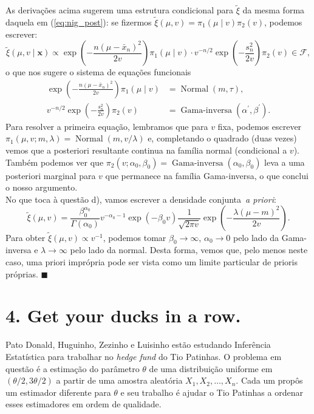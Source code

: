 \documentclass[a4paper,10pt, notitlepage]{report}
\newcommand{\rs}{X_1, X_2, \ldots, X_n} %
\begin{document}
{$$$$
As derivações acima sugerem uma estrutura condicional para $\tilde{\xi}$ da mesma forma daquela em (\ref{eq:nig_post}): se fizermos $\tilde{\xi}(\mu, v) = \pi_1(\mu \mid v) \pi_2(v)$, podemos escrever:
$$
\tilde{\xi}(\mu, v \mid \boldsymbol{x}) \propto \exp\left(-\frac{n(\mu-\bar{x}_n)^2}{2v}\right)\pi_1(\mu \mid v) \cdot v^{-n/2}\exp\left(-\frac{s_n^2}{2v}\right)\pi_2(v) \in \mathcal{F},
$$
o que nos sugere o sistema de equações funcionais
\begin{align*}
 \exp\left(-\frac{n(\mu-\bar{x}_n)^2}{2v}\right)\pi_1(\mu \mid v)  &= \operatorname{Normal}(m, \tau),\\
 v^{-n/2}\exp\left(-\frac{s_n^2}{2v}\right)\pi_2(v) &= \operatorname{Gama-inversa}(\alpha^\prime, \beta^\prime).
\end{align*}
Para resolver a primeira equação, lembramos que para $v$ fixa, podemos escrever $\pi_1(\mu, v; m, \lambda) = \operatorname{Normal}(m, v/\lambda)$ e, completando o quadrado (duas vezes) vemos que a posteriori resultante continua na família normal (condicional a $v$).
Também podemos ver que $\pi_2(v; \alpha_0, \beta_0) = \operatorname{Gama-inversa}(\alpha_0, \beta_0)$ leva a uma posteriori marginal para $v$ que permanece na família Gama-inversa, o que conclui o nosso argumento.
\\
No que toca à questão d), vamos escrever a densidade conjunta~\textit{a priori}:
$$
\tilde{\xi}(\mu, v) = \frac{\beta_0^{\alpha_0}}{\Gamma(\alpha_0)} v^{-\alpha_0-1}\exp\left(-\beta_0 v\right)\frac{1}{\sqrt{2\pi v}}\exp\left(-\frac{\lambda (\mu-m)^2}{2v}\right).
$$
Para obter $\tilde{\xi}(\mu, v) \propto v^{-1}$, podemos tomar $\beta_0 \to \infty$, $\alpha_0 \to 0$ pelo lado da Gama-inversa e $\lambda \to \infty$ pelo lado da normal.
Desta forma, vemos que, pelo menos neste caso, uma priori imprópria pode ser vista como um limite particular de prioris próprias.
$\blacksquare$
}

\section*{4. Get your ducks in a row.}

Pato Donald, Huguinho, Zezinho e Luisinho estão estudando Inferência Estatística para trabalhar no \textit{hedge fund} do Tio Patinhas.
O problema em questão é a estimação do parâmetro $\theta$ de uma distribuição uniforme em $(\theta/2, 3\theta/2)$ a partir de uma amostra aleatória $\rs$.
Cada um propôs um estimador diferente para $\theta$ e seu trabalho é ajudar o Tio Patinhas a ordenar esses estimadores em ordem de qualidade.
\end{document}

